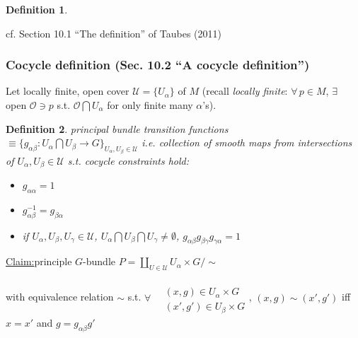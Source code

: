\documentclass[10pt]{amsart}
\newtheorem{definition}{Definition}
\newenvironment{claim}[1]{\par\noindent\underline{Claim:}\space#1}{}
\begin{document}
\begin{multicols*}{2}
\begin{definition}
\begin{itemize}
\end{itemize}
\end{definition} cf. Section 10.1 ``The definition'' of Taubes (2011) \cite{CTaubes2011}

\subsubsection{Cocycle definition (Sec. 10.2 ``A cocycle definition'') \cite{CTaubes2011} }

Let locally finite, open cover $\mathcal{U} = \lbrace U_{\alpha} \rbrace$ of $M$ (recall \emph{locally finite}: $\forall \, p \in M$, $\exists \, $ open $\mathcal{O} \ni p$ s.t. $\mathcal{O} \bigcap U_{\alpha}$ for only finite many $\alpha$'s).  

\begin{definition}
  \emph{principal bundle transition functions} $\equiv \lbrace g_{\alpha \beta} : U_{\alpha} \bigcap U_{\beta} \to G \rbrace_{U_{\alpha},U_{\beta} \in \mathcal{U}}$ i.e. collection of smooth maps from intersections of $U_{\alpha},U_{\beta} \in \mathcal{U}$ s.t. \emph{cocycle constraints} hold:
\begin{itemize}
  \item $g_{\alpha \alpha} =1$ 
  \item $g^{-1}_{\alpha \beta} = g_{\beta \alpha }$
    \item if $U_{\alpha}, U_{\beta}, U_{\gamma} \in \mathcal{U}$, $U_{\alpha} \bigcap U_{\beta} \bigcap U_{\gamma} \neq \emptyset$, $g_{\alpha \beta} g_{\beta \gamma} g_{\gamma \alpha } =1$
\end{itemize}
\end{definition}

\begin{claim}
  principle $G$-bundle $P = \coprod_{U \in \mathcal{U}} U_{\alpha} \times G / \sim$

with equivalence relation $\sim$ s.t. $\forall \, \begin{aligned} & \quad \\
  & (x,g) \in U_{\alpha} \times G \\
  & (x',g') \in U_{\beta} \times G \end{aligned}$, $(x,g) \sim (x',g')$ iff $x=x'$ and $g=g_{\alpha \beta} g'$
\end{claim}


\end{multicols*}
\end{document}
